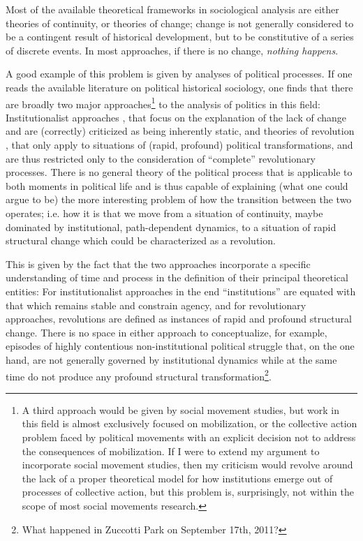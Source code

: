 Most of the available theoretical frameworks in sociological analysis are either theories of continuity, or theories of change; change is not generally considered to be a contingent result of historical development, but to be constitutive of a series of discrete events. In most approaches, if there is no change, \emph{nothing happens}.

A good example of this problem is given by analyses of political processes.
If one reads the available literature on political historical sociology, one finds that there are broadly two major approaches\footnote{
    \label{foot:socmov}
    A third approach would be given by social movement studies, but work in this field is almost exclusively focused on mobilization, or the collective action problem faced by political movements with an explicit decision not to address the consequences of mobilization.%
    If I were to extend my argument to incorporate social movement studies, then my criticism would revolve around the lack of a proper theoretical model for how institutions emerge out of processes of collective action, but this problem is, surprisingly, not within the scope of most social movements research.
} to the analysis of politics in this field:
Institutionalist approaches \citep{hall1996,thelen1999,thelen2003,mahoney2009,mahoney2010}, that focus on the explanation of the lack of change and are (correctly) criticized as being inherently static, and theories of revolution \citep{skocpol1979,goldstone1991,goldstone2001,sewell1985}, that only apply to situations of (rapid, profound) political transformations, and are thus restricted only to the consideration of ``complete'' revolutionary processes.
There is no general theory of the political process that is applicable to both moments in political life and is thus capable of explaining (what one could argue to be) the more interesting problem of how the transition between the two operates; i.e. how it is that we move from a situation of continuity, maybe dominated by institutional, path-dependent dynamics, to a situation of rapid structural change which could be characterized as a revolution.

This is given by the fact that the two approaches incorporate a specific understanding of time and process in the definition of their principal theoretical entities:
For institutionalist approaches in the end ``institutions'' are equated with that which remains stable and constrain agency, and for revolutionary approaches, revolutions are defined as instances of rapid and profound structural change.
There is no space in either approach to conceptualize, for example, episodes of highly contentious non-institutional political struggle that, on the one hand, are not generally governed by institutional dynamics while at the same time do not produce any profound structural transformation\footnote{
    What happened in Zuccotti Park on September 17th, 2011?
}.

